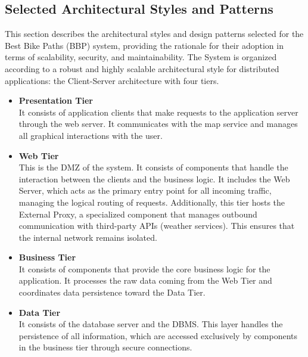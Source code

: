 \subsection{Selected Architectural Styles and Patterns}
\noindent
This section describes the architectural styles and design patterns selected for the Best Bike Paths (BBP) system, providing the rationale for their adoption in terms of scalability, security, and maintainability.
The System is organized according to a robust and highly scalable architectural style for distributed applications: the Client-Server architecture with four tiers.
\begin{itemize}
    \item \textbf{Presentation Tier}\\
    It consists of application clients that make requests to the application server through the web server. It communicates with the map service and manages all graphical interactions with the user.
    \item \textbf{Web Tier}\\
    This is the DMZ of the system. It consists of components that handle the interaction between the clients and the business logic. It includes the Web Server, which acts as the primary entry point for all incoming traffic, managing the logical routing of requests. Additionally, this tier hosts the External Proxy, a specialized component that manages outbound communication with third-party APIs (weather services). This ensures that the internal network remains isolated.
    \item \textbf{Business Tier}\\
    It consists of components that provide the core business logic for the application. It processes the raw data coming from the Web Tier and coordinates data persistence toward the Data Tier.
    \item \textbf{Data Tier}\\
    It consists of the database server and the DBMS. This layer handles the persistence of all information, which are accessed exclusively by components in the business tier through secure connections.
\end{itemize}

